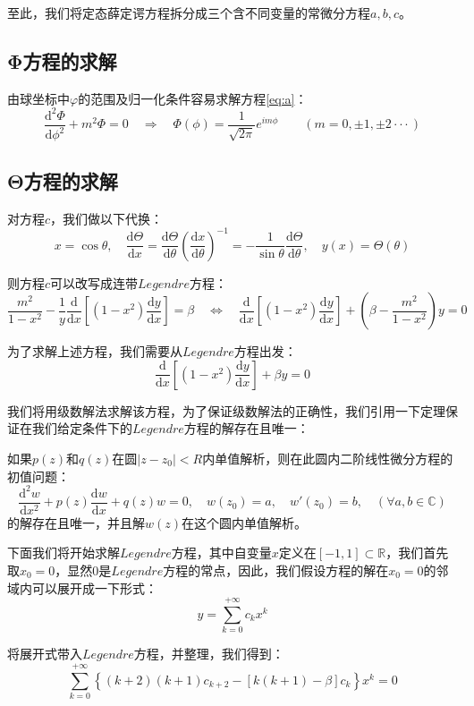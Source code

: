 至此，我们将定态薛定谔方程拆分成三个含不同变量的常微分方程$a,b,c$。
\subsection{Φ方程的求解}
由球坐标中$\varphi$的范围及归一化条件容易求解方程\ref{eq:a}：
\[\frac{\mathrm{d}^2 \varPhi}{\mathrm{d}{\phi^2}}+ m^2 \varPhi=0 \quad \Rightarrow \quad \varPhi(\phi)=\frac{1}{\sqrt{2\pi}}e^{im\phi} \qquad (m=0,\pm 1,\pm 2\cdot\cdot\cdot)\]

\subsection{Θ方程的求解}
对方程$c$，我们做以下代换：
\[x=\cos\theta, \quad \frac{\mathrm{d} \Theta}{\mathrm{d} x}=\frac{\mathrm{d} \Theta}{\mathrm{d} \theta}\left ( \frac{\mathrm{d} x}{\mathrm{d} \theta} \right )^{-1}=-\frac{1}{\sin\theta} \frac{\mathrm{d} \Theta}{\mathrm{d} \theta}, \quad y(x)=\Theta(\theta)\]

则方程$c$可以改写成连带$Legendre$方程：
\[\frac{m^2}{1-x^2}-\frac{1}{y}\frac{\mathrm{d}}{\mathrm{d}{x}} \left [(1-x^2) \frac{\mathrm{d} y}{\mathrm{d}{x}} \right ]=\beta \quad \Leftrightarrow \quad \frac{\mathrm{d}}{\mathrm{d}{x}} \left [(1-x^2) \frac{\mathrm{d} y}{\mathrm{d}{x}} \right ]+\left (\beta- \frac{m^2}{1-x^2} \right )y=0\]

为了求解上述方程，我们需要从$Legendre$方程出发：
\[\frac{\mathrm{d}}{\mathrm{d}{x}} \left [(1-x^2) \frac{\mathrm{d} y}{\mathrm{d}{x}} \right ]+\beta y=0\]

我们将用级数解法求解该方程，为了保证级数解法的正确性，我们引用一下定理保证在我们给定条件下的$Legendre$方程的解存在且唯一：
\begin{theorem}
如果$p(z)$和$q(z)$在圆$|z-z_0|<R$内单值解析，则在此圆内二阶线性微分方程的初值问题：
\[\frac{\mathrm{d}^2w}{\mathrm{d}x^2}+p(z)\frac{\mathrm{d}w}{\mathrm{d}x}+q(z)w=0, \quad w(z_0)=a, \quad w'(z_0)=b, \quad (\forall a,b \in \mathbb{C})\]
的解存在且唯一，并且解$w(z)$在这个圆内单值解析。
\end{theorem}

下面我们将开始求解$Legendre$方程，其中自变量$x$定义在$[-1,1] \subset \mathbb{R}$，我们首先取$x_0=0$，显然0是$Legendre$方程的常点，因此，我们假设方程的解在$x_0=0$的邻域内可以展开成一下形式：
\[y=\sum_{k=0}^{+\infty}c_kx^k\]

将展开式带入$Legendre$方程，并整理，我们得到：
\[\sum_{k=0}^{+\infty} \left \{ (k+2)(k+1)c_{k+2}-[k(k+1)-\beta]c_k \right \}x^k=0\]

